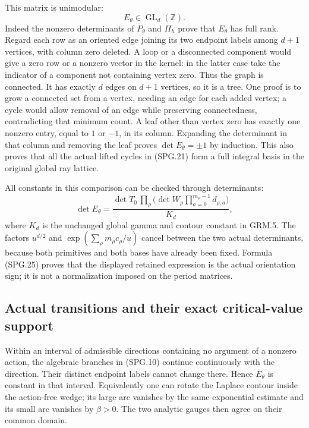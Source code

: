 This matrix is unimodular:
\[
                    E_\theta\in\operatorname{GL}_d(\mathbb Z).
 \tag{SPG.25}\label{eq:spg-unimodular}
\]
Indeed the nonzero determinants of \(P_\theta\) and \(\Pi_h\)
prove that \(E_\theta\) has full rank. Regard each row as an
oriented edge joining its two endpoint labels among \(d+1\)
vertices, with column zero deleted. A loop or a disconnected
component would give a zero row or a nonzero vector in the kernel:
in the latter case take the indicator of a component not containing
vertex zero. Thus the graph is connected. It has exactly \(d\)
edges on \(d+1\) vertices, so it is a tree. One proof is to grow
a connected set from a vertex, needing an edge for each added
vertex; a cycle would allow removal of an edge while preserving
connectedness, contradicting that minimum count. A leaf other than
vertex zero has exactly one nonzero entry, equal to \(1\) or
\(-1\), in its column. Expanding the determinant in that column
and removing the leaf proves \(\det E_\theta=\pm1\) by induction.
This also proves that all the actual lifted cycles in (SPG.21) form
a full integral basis in the original global ray lattice.

All constants in this comparison can be checked through determinants:
\[
 \det E_\theta
   =\frac{\det T_0\,
         \prod_\rho\bigl(\det W_\rho
                         \prod_{a=0}^{m_\rho-1}d_{\rho,a}\bigr)}{K_d},
 \tag{SPG.26}\label{eq:spg-det-constants}
\]
where \(K_d\) is the unchanged global gamma and contour constant
in GRM.5. The factors \(u^{d/2}\) and
\(\exp(\sum_\rho m_\rho c_\rho/u)\) cancel between the two
actual determinants, because both primitives and both bases have
already been fixed. Formula (SPG.25) proves that the displayed
retained expression is the actual orientation sign; it is not a
normalization imposed on the period matrices.

\subsection{Actual transitions and their exact critical-value support}

Within an interval of admissible directions containing no argument
of a nonzero action, the algebraic branches in (SPG.10) continue
continuously with the direction. Their distinct endpoint labels cannot
change there. Hence \(E_\theta\) is constant in that interval.
Equivalently one can rotate the Laplace contour inside the action-free
wedge; its large arc vanishes by the same exponential estimate and
its small arc vanishes by \(\beta>0\). The two analytic gauges
then agree on their common domain.

